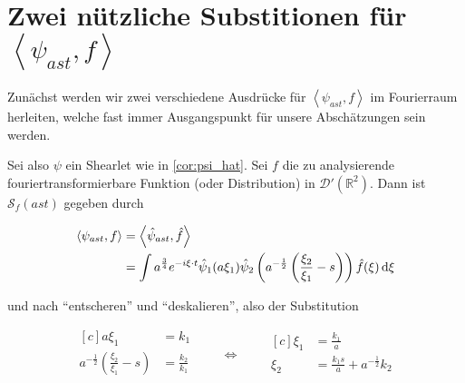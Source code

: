 

\section{\texorpdfstring{Zwei nützliche Substitionen für  $\left<\psi_{ast}, f\right>$}{zwei nützliche Substitutionen}}
\label{sec:substitutionen}


Zunächst werden wir zwei verschiedene Ausdrücke für $\left<\psi_{ast}, f\right>$
im Fourierraum herleiten, welche fast immer Ausgangspunkt für unsere Abschätzungen sein werden.

Sei also $\psi$ ein Shearlet wie in \cref{cor:psi_hat}. Sei $f$ die zu
analysierende fouriertransformierbare Funktion (oder Distribution) in
$\mathcal{D}' (\mathbb{R}^2)$. Dann ist $\mathcal{S}_f (ast)$ gegeben durch

\begin{align*}
\left< \psi_{ast}, f \right> &= \left<\hat\psi_{ast}, \hat f\right> \\
 &= \int a^{\frac{3}{4}} e^{-i \xi \cdot t} \hat \psi_1(a \xi_1)
    \hat \psi_2 \left(a^{-\frac{1}{2}} \left(\frac{\xi_2}{\xi_1} - s\right)\right)
    \hat f (\xi) \mathop{}\!\mathrm{d} \xi
\end{align*}

und nach "`entscheren"' und "`deskalieren"', also der Substitution

\begin{equation}
\begin{aligned}[c]
a \xi_1 &= k_1\\
a^{-\frac{1}{2}} \left(\frac{\xi_2}{\xi_1} - s\right) &=\frac{k_2}{k_1}\\
\end{aligned}
\qquad\Longleftrightarrow\qquad
\begin{aligned}[c]
\xi_1 &= \frac{k_1}{a}\\
\xi_2 &= \frac{k_1 s}{a} + a^{-\frac{1}{2}} k_2\\
\end{aligned}
\label{eq:substitution1_coords}
\end{equation}


